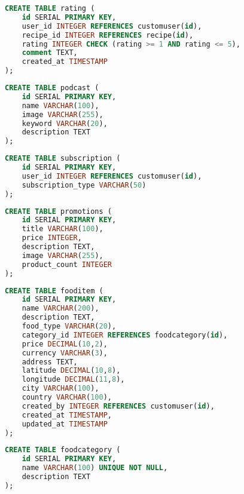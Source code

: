 \documentclass[conference]{IEEEtran}
\begin{document}
\begin{lstlisting}[language=SQL, basicstyle=\scriptsize\ttfamily, caption={Rating Table}]
CREATE TABLE rating (
    id SERIAL PRIMARY KEY,
    user_id INTEGER REFERENCES customuser(id),
    recipe_id INTEGER REFERENCES recipe(id),
    rating INTEGER CHECK (rating >= 1 AND rating <= 5),
    comment TEXT,
    created_at TIMESTAMP
);
\end{lstlisting}

\begin{lstlisting}[language=SQL, basicstyle=\scriptsize\ttfamily, caption={Podcast Table}]
CREATE TABLE podcast (
    id SERIAL PRIMARY KEY,
    name VARCHAR(100),
    image VARCHAR(255),
    keyword VARCHAR(20),
    description TEXT
);
\end{lstlisting}

\begin{lstlisting}[language=SQL, basicstyle=\scriptsize\ttfamily, caption={Subscription Table}]
CREATE TABLE subscription (
    id SERIAL PRIMARY KEY,
    user_id INTEGER REFERENCES customuser(id),
    subscription_type VARCHAR(50)
);
\end{lstlisting}

\begin{lstlisting}[language=SQL, basicstyle=\scriptsize\ttfamily, caption={Promotions Table}]
CREATE TABLE promotions (
    id SERIAL PRIMARY KEY,
    title VARCHAR(100),
    price INTEGER,
    description TEXT,
    image VARCHAR(255),
    product_count INTEGER
);
\end{lstlisting}

\begin{lstlisting}[language=SQL, basicstyle=\scriptsize\ttfamily, caption={FoodItem Table}]
CREATE TABLE fooditem (
    id SERIAL PRIMARY KEY,
    name VARCHAR(200),
    description TEXT,
    food_type VARCHAR(20),
    category_id INTEGER REFERENCES foodcategory(id),
    price DECIMAL(10,2),
    currency VARCHAR(3),
    address TEXT,
    latitude DECIMAL(10,8),
    longitude DECIMAL(11,8),
    city VARCHAR(100),
    country VARCHAR(100),
    created_by INTEGER REFERENCES customuser(id),
    created_at TIMESTAMP,
    updated_at TIMESTAMP
);
\end{lstlisting}

\begin{lstlisting}[language=SQL, basicstyle=\scriptsize\ttfamily, caption={FoodCategory Table}]
CREATE TABLE foodcategory (
    id SERIAL PRIMARY KEY,
    name VARCHAR(100) UNIQUE NOT NULL,
    description TEXT
);
\end{lstlisting}
\end{document}
